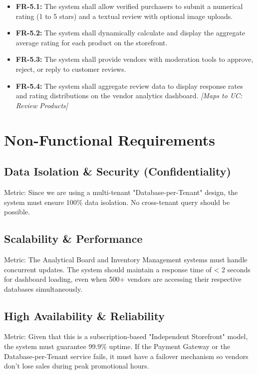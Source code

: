 \begin{itemize}
    \item \textbf{FR-5.1:} The system shall allow verified purchasers to submit a numerical rating (1 to 5 stars) and a textual review with optional image uploads.
    \item \textbf{FR-5.2:} The system shall dynamically calculate and display the aggregate average rating for each product on the storefront.
    \item \textbf{FR-5.3:} The system shall provide vendors with moderation tools to approve, reject, or reply to customer reviews.
    \item \textbf{FR-5.4:} The system shall aggregate review data to display response rates and rating distributions on the vendor analytics dashboard. \textit{[Maps to UC: Review Products]}
\end{itemize}

\section{Non-Functional Requirements}

\subsection{Data Isolation \& Security (Confidentiality)}
Metric: Since we are using a multi-tenant "Database-per-Tenant" design, the system must ensure 100\% data isolation. No cross-tenant query should be possible.

\subsection{Scalability \& Performance}
Metric: The Analytical Board and Inventory Management systems must handle concurrent updates. The system should maintain a response time of < 2 seconds for dashboard loading, even when 500+ vendors are accessing their respective databases simultaneously.

\subsection{High Availability \& Reliability}
Metric: Given that this is a subscription-based "Independent Storefront" model, the system must guarantee 99.9\% uptime. If the Payment Gateway or the Database-per-Tenant service fails, it must have a failover mechanism so vendors don't lose sales during peak promotional hours.

